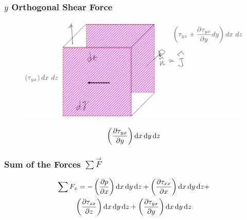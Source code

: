 \documentclass[class=report, crop=false, 12pt,a4paper]{standalone}
\begin{document}
\subsubsection{$y$ Orthogonal Shear Force}
\begin{figure}[H]
  \centering
  \includegraphics[width = 0.6 \textwidth]{../img/forceinxy.png}
\end{figure}
\begin{equation}
  \left( \frac{\partial \tau_{yx}}{\partial y} \right) \dif x \dif y \dif z
\end{equation}
\subsubsection{Sum of the Forces $\sum \vec{F}$}
\begin{multline}
  \sum F_x = - \left( \frac{\partial p}{\partial x} \right) \dif x \dif y \dif z + \left( \frac{\partial \tau_{xx}}{\partial x} \right) \dif x \dif y \dif z + \\ \left( \frac{\partial \tau_{zx}}{\partial z} \right) \dif x \dif y \dif z + \left( \frac{\partial \tau_{yx}}{\partial y} \right) \dif x \dif y \dif z
\end{multline}
\end{document}
